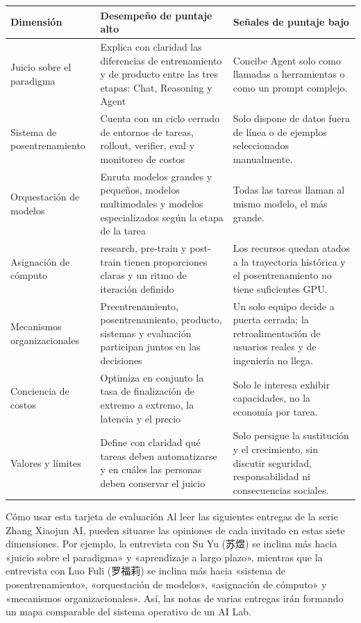 \documentclass[a4paper]{article}
\begin{document}
\noindent\begin{longtable}{p{}p{}p{}}
\toprule
Dimensión & Desempeño de puntaje alto & Señales de puntaje bajo \\
\midrule
Juicio sobre el paradigma & Explica con claridad las diferencias de entrenamiento y de producto entre las tres etapas: Chat, Reasoning y Agent & Concibe Agent solo como llamadas a herramientas o como un prompt complejo. \\
Sistema de posentrenamiento & Cuenta con un ciclo cerrado de entornos de tareas, rollout, verifier, eval y monitoreo de costos & Solo dispone de datos fuera de línea o de ejemplos seleccionados manualmente. \\
Orquestación de modelos & Enruta modelos grandes y pequeños, modelos multimodales y modelos especializados según la etapa de la tarea & Todas las tareas llaman al mismo modelo, el más grande. \\
Asignación de cómputo & research, pre-train y post-train tienen proporciones claras y un ritmo de iteración definido & Los recursos quedan atados a la trayectoria histórica y el posentrenamiento no tiene suficientes GPU. \\
Mecanismos organizacionales & Preentrenamiento, posentrenamiento, producto, sistemas y evaluación participan juntos en las decisiones & Un solo equipo decide a puerta cerrada; la retroalimentación de usuarios reales y de ingeniería no llega. \\
Conciencia de costos & Optimiza en conjunto la tasa de finalización de extremo a extremo, la latencia y el precio & Solo le interesa exhibir capacidades, no la economía por tarea. \\
Valores y límites & Define con claridad qué tareas deben automatizarse y en cuáles las personas deben conservar el juicio & Solo persigue la sustitución y el crecimiento, sin discutir seguridad, responsabilidad ni consecuencias sociales. \\
\bottomrule
\end{longtable}

\begin{knowledgebox}{Cómo usar esta tarjeta de evaluación}
Al leer las siguientes entregas de la serie Zhang Xiaojun AI, pueden situarse las opiniones de cada invitado en estas siete dimensiones. Por ejemplo, la entrevista con Su Yu (苏煜) se inclina más hacia «juicio sobre el paradigma» y «aprendizaje a largo plazo», mientras que la entrevista con Luo Fuli (罗福莉) se inclina más hacia «sistema de posentrenamiento», «orquestación de modelos», «asignación de cómputo» y «mecanismos organizacionales». Así, las notas de varias entregas irán formando un mapa comparable del sistema operativo de un AI Lab.
\end{knowledgebox}
\end{document}
